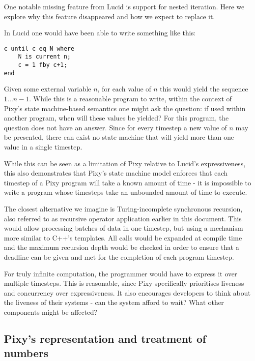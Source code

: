 \documentclass{scrartcl}
\begin{document}
    One notable missing feature from Lucid is support for nested iteration. Here we explore why this feature disappeared and how we expect to replace it.
    
    In Lucid one would have been able to write something like this:
    
    \begin{lstlisting}
c until c eq N where
    N is current n;
    c = 1 fby c+1;
end
    \end{lstlisting}
    
    Given some external variable $n$, for each value of $n$ this would yield the sequence $1 \dots n-1$. While this is a reasonable program to write, within the context of Pixy's state machine-based semantics one might ask the question: if used within another program, when will these values be yielded? For this program, the question does not have an answer. Since for every timestep a new value of $n$ may be presented, there can exist no state machine that will yield more than one value in a single timestep.
    
    While this can be seen as a limitation of Pixy relative to Lucid's expressiveness, this also demonstrates that Pixy's state machine model enforces that each timestep of a Pixy program will take a known amount of time - it is impossible to write a program whose timesteps take an unbounded amount of time to execute.
    
    The closest alternative we imagine is Turing-incomplete synchronous recursion, also referred to as recursive operator application earlier in this document. This would allow processing batches of data in one timestep, but using a mechanism more similar to C++'s templates. All calls would be expanded at compile time and the maximum recursion depth would be checked in order to ensure that a deadline can be given and met for the completion of each program timestep.
    
    For truly infinite computation, the programmer would have to express it over multiple timesteps. This is reasonable, since Pixy specifically prioritises liveness and concurrency over expressiveness. It also encourages developers to think about the liveness of their systems - can the system afford to wait? What other components might be affected?
    
    \subsection{Pixy's representation and treatment of numbers}
    
\end{document}
